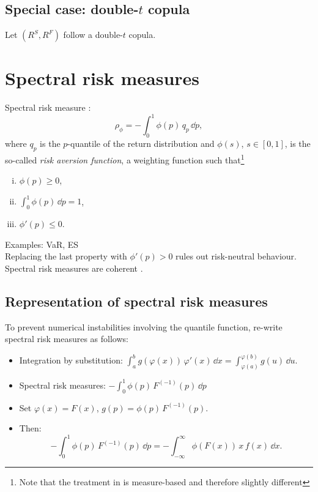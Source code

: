 \documentclass[square]{article} %
\theoremstyle{plain}
\theoremstyle{definition} %
\begin{document}
\subsection{Special case: double-$t$ copula}
\label{sec:special-case:-double}
Let $(R^S, R^F)$ follow a double-$t$ copula.



\section{Spectral risk measures}
\label{sec:spectr-risk-meas}

Spectral risk measure \citep{Acerbi2002,Cotter2006}:
\begin{equation*}
\rho_\phi = -\int_0^1 \phi(p)\, q_p\, \dd p,
\end{equation*}
where $q_p$ is the $p$-quantile of the return distribution and
$\phi(s)$, $s\in [0,1]$, is the so-called {\em risk aversion
  function\/}, a weighting function such that\footnote{Note that the
  treatment in \citep{Acerbi2002} is measure-based and therefore
  slightly different} 
\begin{enumerate}[(i)]
\item $\phi(p)\geq 0$,
\item $\int_0^1\phi(p)\, \dd p=1$,
\item $\phi'(p)\leq 0$. 
\end{enumerate}
Examples: VaR, ES\\
Replacing the last property with $\phi'(p)>0$ rules out risk-neutral
behaviour. \\
Spectral risk measures are coherent \citep{Acerbi2002}. 

\subsection{Representation of spectral risk measures}
\label{sec:repr-spectr-risk}

To prevent numerical instabilities involving the quantile function,
re-write spectral risk measures as follows:
\begin{itemize}
\item Integration by substitution: $\displaystyle \int_a^b
  g(\varphi(x)) \,\varphi'(x)\, \dd x = \int_{\varphi(a)}^{\varphi(b)}
  g(u)\, \dd u$.
\item Spectral risk measures: $\displaystyle -\int_0^1 \phi(p) \,
  F^{(-1)}(p)\, \dd p$
\item Set $\varphi(x)=F(x)$, $g(p) = \phi(p)\, F^{(-1)}(p)$.
\item Then:
  \begin{equation*}
    -\int_0^1 \phi(p)\, F^{(-1)}(p)\, \dd p = -\int_{-\infty}^\infty
    \phi(F(x))\, x\, f(x)\, \dd x.
  \end{equation*}
\end{itemize}
\end{document}
